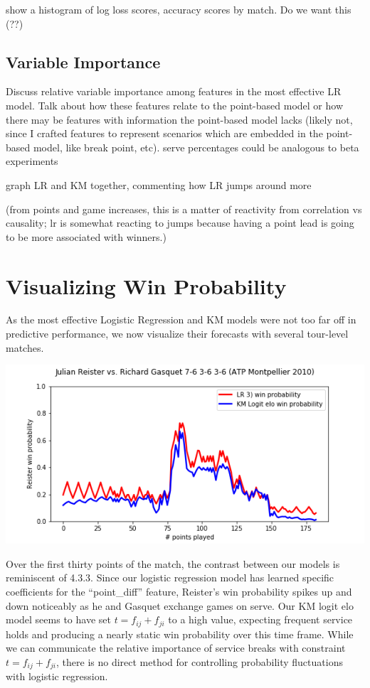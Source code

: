 \documentclass[chapterprefix=false]{report}
\begin{document}
show a histogram of log loss scores, accuracy scores by match. Do we want this (??)



\subsection{Variable Importance}

Discuss relative variable importance among features in the most effective LR model. Talk about how these features relate to the point-based model or how there may be features with information the point-based model lacks (likely not, since I crafted features to represent scenarios which are embedded in the point-based model, like break point, etc). serve percentages could be analogous to beta experiments

graph LR and KM together, commenting how LR jumps around more

(from points and game increases, this is a matter of reactivity from correlation vs causality; lr is somewhat reacting to jumps because having a point lead is going to be more associated with winners.)

\section{Visualizing Win Probability}

As the most effective Logistic Regression and KM models were not too far off in predictive performance, we now visualize their forecasts with several tour-level matches. 

\includegraphics[scale=.7]{reister_gasquet}

Over the first thirty points of the match, the contrast between our models is reminiscent of 4.3.3. Since our logistic regression model has learned specific coefficients for the ``point\_diff'' feature, Reister's win probability spikes up and down noticeably as he and Gasquet exchange games on serve. Our KM logit elo model seems to have set $t = f_{ij} + f_{ji}$ to a high value, expecting frequent service holds and producing a nearly static win probability over this time frame. While we can communicate the relative importance of service breaks with constraint $t=f_{ij}+f_{ji}$, there is no direct method for controlling probability fluctuations with logistic regression.
\end{document}
